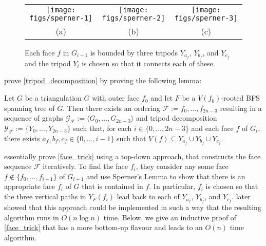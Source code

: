 \documentclass{patmorin}
\begin{document}

\begin{figure}
  \begin{center}
    \begin{tabular}{ccc}
      \texttt{[image: figs/sperner-1]} &
      \texttt{[image: figs/sperner-2]} &
      \texttt{[image: figs/sperner-3]} \\
      (a) & (b) & (c)
    \end{tabular}
  \end{center}
  \caption{Each face $f$ in $G_{i-1}$ is bounded by three tripods $Y_{a_f}$, $Y_{b_f}$, and $Y_{c_f}$ and the tripod $Y_i$ is chosen so that it connects each of these.}
  \label{sperner}
\end{figure}

\citet{dujmovic.joret.ea:planar} prove \cref{tripod_decomposition} by proving the following lemma:

\begin{lem}\label{face_trick}
  Let $G$ be a triangulation $G$ with outer face $f_0$ and let $F$ be a $V(f_0)$-rooted BFS spanning tree of $G$.  Then there exists an ordering $\mathcal{F}:=f_0,\ldots,f_{2n-3}$ resulting in a sequence of graphs $\mathcal{G_F}:=\langle G_0,\ldots,G_{2n-3}\rangle$ and tripod decomposition $\mathcal{Y_F}:=\{Y_0,\ldots,Y_{2n-3}\}$ such that, for each $i\in\{0,\ldots,2n-3\}$ and each face $f$ of $G_i$, there exists $a_f,b_f,c_f\in\{0,\ldots,i-1\}$ such that $V(f)\subseteq Y_{a_f}\cup Y_{b_f}\cup Y_{c_f}$.
\end{lem}

\citet{dujmovic.joret.ea:planar} essentially prove \cref{face_trick} using a top-down approach, that constructs the face sequence $\mathcal{F}$ iteratively.  To find the face $f_i$, they consider any some face $f\not\in\{f_0,\ldots,f_{i-1}\}$ of $G_{i-1}$ and use Sperner's Lemma to show that there is an appropriate face $f_i$ of $G$ that is contained in $f$. In particular, $f_i$ is chosen so that the three vertical paths in $Y_F(f_i)$ lead back to each of $Y_{a_f}$, $Y_{b_f}$, and $Y_{c_f}$. \citet{morin:fast} later showed that this approach could be implemented in such a way that the resulting algorithm runs in $O(n\log n)$ time.  Below, we give an inductive proof of \cref{face_trick} that has a more bottom-up flavour and leads to an $O(n)$ time algorithm.
\end{document}
